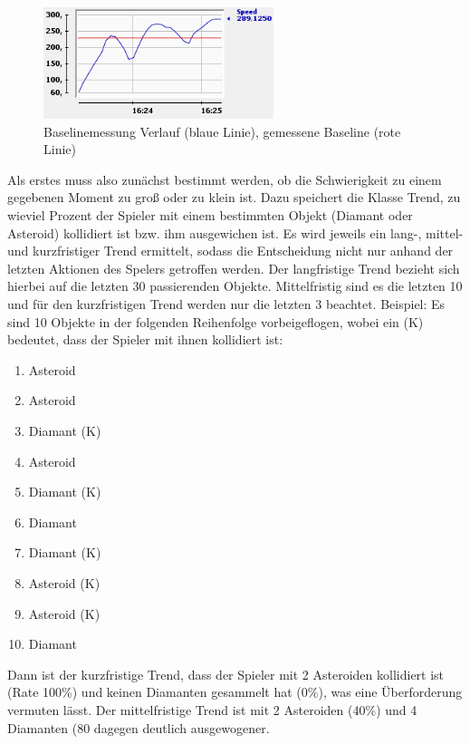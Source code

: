 \documentclass[a4paper,12pt]{scrartcl}
\begin{document}
\begin{figure}[htp]
\begin{center}
  \includegraphics[width=0.6\textwidth]{Baseline.png}
  \caption[Baselinemessungsverlauf]{Baselinemessung Verlauf (blaue Linie),
  gemessene Baseline (rote Linie)}
  \label{fig:Baseline}
\end{center}
\end{figure} 

Als erstes muss also zunächst bestimmt werden, ob die Schwierigkeit zu einem gegebenen
Moment zu groß oder zu klein ist. Dazu speichert die Klasse Trend, zu wieviel Prozent
der Spieler mit einem bestimmten Objekt (Diamant oder Asteroid) kollidiert ist bzw. ihm
ausgewichen ist. Es wird jeweils ein lang-, mittel- und kurzfristiger Trend ermittelt, sodass
die Entscheidung nicht nur anhand der letzten Aktionen des Spelers getroffen werden.
Der langfristige Trend bezieht sich hierbei auf die letzten 30 passierenden Objekte.
Mittelfristig sind es die letzten 10 und für den kurzfristigen Trend werden nur die letzten 3
beachtet.
Beispiel: Es sind 10 Objekte in der folgenden Reihenfolge vorbeigeflogen, wobei ein (K)
bedeutet, dass der Spieler mit ihnen kollidiert ist:
\begin{enumerate}
\item Asteroid
\item Asteroid
\item Diamant (K)
\item Asteroid
\item Diamant (K)
\item Diamant
\item Diamant (K)
\item Asteroid (K)
\item Asteroid (K)
\item Diamant
\end{enumerate}
Dann ist der kurzfristige Trend, dass der Spieler mit 2 Asteroiden kollidiert
ist (Rate 100\%) und keinen Diamanten gesammelt hat (0\%), was eine Überforderung vermuten lässt.
Der mittelfristige Trend ist mit 2 Asteroiden (40\%) und 4 Diamanten (80%
dagegen deutlich ausgewogener.
\end{document}
